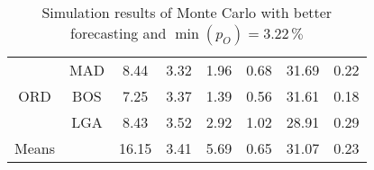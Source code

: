 \begin{table}
\begin{center}
\begin{tabular}{c c | c c | c c | c | c }
~    &  MAD  &    8.44  &  3.32  &    1.96  &  0.68  &  31.69  &  0.22 \\[.5ex]
ORD  &  BOS  &    7.25  &  3.37  &    1.39  &  0.56  &  31.61  &  0.18 \\
~    &  LGA  &    8.43  &  3.52  &    2.92  &  1.02  &  28.91  &  0.29 \\
\midrule
Means &  ~   &   16.15  &  3.41  &    5.69  &  0.65  &  31.07  &  0.23 \\
    \bottomrule
\end{tabular}
\caption{Simulation results of Monte Carlo with better forecasting and $\min(p_O) = 3.22\,\%$}
\label{tbl:resultsSecond}
\end{center}
\end{table}


